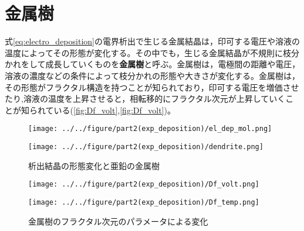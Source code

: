 \documentclass[autodetect-engine,dvi=dvipdfmx,a4paper,ja=standard,oneside,openany,11pt,draft]{bxjsbook}
\begin{document}
\section{金属樹}
式\eqref{eq:electro_deposition}の電界析出で生じる金属結晶は，印可する電圧や溶液の温度によってその形態が変化する\cite{suda2003temperature}。その中でも，生じる金属結晶が不規則に枝分かれをして成長していくものを\textbf{金属樹}と呼ぶ。金属樹は，電極間の距離や電圧，溶液の濃度などの条件によって枝分かれの形態や大きさが変化する。金属樹は，その形態がフラクタル構造を持つことが知られており\cite{matsushita1984fractal}，印可する電圧を増価させたり\cite{matsushita1984fractal},溶液の温度を上昇させると\cite{suda2003temperature}，相転移的にフラクタル次元が上昇していくことが知られている(\ref{fig:Df_volt},\ref{fig:Df_volt})。
\begin{figure}[H]
  \begin{minipage}
    {0.65\textwidth}
    \centering
    \texttt{[image: ../../figure/part2(exp\_deposition)/el\_dep\_mol.png]}
    \label{fig:el_dep_mol}
  \end{minipage}
  \begin{minipage}
    {0.32\textwidth}
    \centering
    \texttt{[image: ../../figure/part2(exp\_deposition)/dendrite.png]}
    \label{fig:el_dep_fractal}
  \end{minipage}
  \caption{析出結晶の形態変化と亜鉛の金属樹}
\end{figure}
\begin{figure}[H]
  \begin{minipage}
    {0.5\textwidth}
    \centering
    \texttt{[image: ../../figure/part2(exp\_deposition)/Df\_volt.png]}
    \label{fig:Df_volt}
  \end{minipage}
  \begin{minipage}
    {0.5\textwidth}
    \centering
    \texttt{[image: ../../figure/part2(exp\_deposition)/Df\_temp.png]}
    \label{fig:Df_temp}
  \end{minipage}
  \caption{金属樹のフラクタル次元のパラメータによる変化}
\end{figure}

\ifdraft{
  
  
}{}
\end{document}

